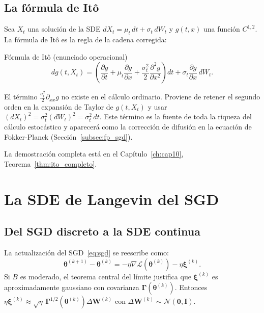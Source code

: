 \subsection{La fórmula de Itô}
\label{subsec:formula_ito}

Sea $X_t$ una solución de la SDE
$dX_t = \mu_t\,dt + \sigma_t\,dW_t$ y $g(t,x)$ una función $C^{1,2}$.
La fórmula de Itô es la regla de la cadena corregida:

\begin{teorema}{Fórmula de Itô (enunciado operacional)}
\label{thm:ito_operacional}
\begin{equation}
  dg(t,X_t) = \left(\frac{\partial g}{\partial t}
  + \mu_t\frac{\partial g}{\partial x}
  + \frac{\sigma_t^2}{2}\frac{\partial^2 g}{\partial x^2}\right)dt
  + \sigma_t\frac{\partial g}{\partial x}\,dW_t.
  \label{eq:ito}
\end{equation}
\end{teorema}

El término $\frac{\sigma_t^2}{2}\partial_{xx}g$ no existe en el cálculo
ordinario. Proviene de retener el segundo orden en la expansión de Taylor
de $g(t,X_t)$ y usar $(dX_t)^2 = \sigma_t^2(dW_t)^2 = \sigma_t^2\,dt$.
Este término es la fuente de toda la riqueza del cálculo estocástico y
aparecerá como la corrección de difusión en la ecuación de Fokker-Planck
(Sección~\ref{subsec:fp_sgd}).

La demostración completa está en el Capítulo~\ref{ch:cap10},
Teorema~\ref{thm:ito_completo}.

\section{La SDE de Langevin del SGD}
\label{sec:langevin_sgd}


\subsection{Del SGD discreto a la SDE continua}
\label{subsec:sgd_sde}

La actualización del SGD~\eqref{eq:sgd} se reescribe como:
\[
  \bm{\theta}^{(k+1)} - \bm{\theta}^{(k)}
  = -\eta\nabla\mathcal{L}(\bm{\theta}^{(k)})
  - \eta\bm{\xi}^{(k)}.
\]
Si $B$ es moderado, el teorema central del límite justifica que
$\bm{\xi}^{(k)}$ es aproximadamente gaussiano con covarianza
$\bm{\Gamma}(\bm{\theta}^{(k)})$. Entonces
$\eta\bm{\xi}^{(k)} \approx
\sqrt{\eta}\,\bm{\Gamma}^{1/2}(\bm{\theta}^{(k)})\Delta\bm{W}^{(k)}$
con $\Delta\bm{W}^{(k)} \sim \mathcal{N}(\bm{0},\bm{I})$.


